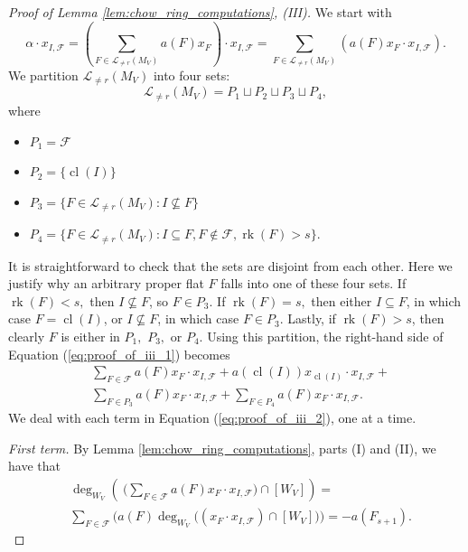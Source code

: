 \documentclass{amsart}
\theoremstyle{plain}
\theoremstyle{definition}
\newcommand{\rk}{\operatorname{rk}}
\newcommand{\cl}{\operatorname{cl}}
\begin{document}
\begin{proof}[Proof of Lemma \ref{lem:chow_ring_computations}, (III)]
We start with 
\begin{equation}
\label{eq:proof_of_iii_1}
    \alpha \cdot x_{I, \mathscr{F}} = \left( \sum_{F \in \mathcal{L}_{\neq r} (M_V)} a(F)x_F \right) \cdot x_{I, \mathscr{F}} = \sum_{F \in \mathcal{L}_{\neq r} (M_V)} \left( a(F) x_F \cdot x_{I, \mathscr{F}} \right).
\end{equation}
We partition $\mathcal{L}_{\neq r}(M_V)$ into four sets:
\[\mathcal{L}_{\neq r}(M_V) = P_1 \sqcup P_2 \sqcup P_3 \sqcup P_4,\]
where
\begin{itemize}
    \item $P_1 = \mathscr{F}$
    \item $P_2 = \{\cl(I)\}$
    \item $P_3 = \{ F\in \mathcal{L}_{\neq r}(M_V)  : I \not \subseteq F\}$
    \item $P_4 = \{F\in \mathcal{L}_{\neq r}(M_V): I \subseteq F, F\notin \mathscr{F}, \rk(F) > s\}.$
\end{itemize}
It is straightforward to check that the sets are disjoint from each other. Here we justify why an arbitrary proper flat $F$ falls into one of these four sets. If $\rk(F) < s,$ then $I \not \subseteq F$, so $F \in P_3$. If $\rk(F) = s,$ then either $I \subseteq F$, in which case $F = \cl(I)$, or $I\not \subseteq F$, in which case $F\in P_3$. Lastly, if $\rk(F) > s$, then clearly $F$ is either in $P_1,$ $P_3,$ or $P_4$.
Using this partition, the right-hand side of Equation (\ref{eq:proof_of_iii_1}) becomes
\begin{equation}
\label{eq:proof_of_iii_2}
\begin{split}
& \sum_{F \in \mathscr{F}}a(F)x_F \cdot x_{I, \mathscr{F}} + a(\cl(I))x_{\cl(I)} \cdot  x_{I,\mathscr{F}} + \\ & \sum_{F \in P_3}a(F)x_F \cdot  x_{I, \mathscr{F}} + \sum_{F \in P_4} a(F)x_F \cdot x_{I, \mathscr{F}}.
\end{split}
\end{equation}
We deal with each term in Equation (\ref{eq:proof_of_iii_2}), one at a time.

\noindent
\textit{First term.} By Lemma \ref{lem:chow_ring_computations}, parts (I) and (II), we have that
\begin{equation}
\begin{split}
& \deg_{W_V}\left(\ \Big( \sum_{F \in \mathscr{F}}a(F)x_F \cdot x_{I, \mathscr{F}} \Big) \cap [W_V] \right) = \\ & \sum_{F \in \mathscr{F}} \Big( a(F) \deg_{W_V}\big((x_F \cdot x_{I, \mathscr{F}}) \cap [W_V]\big) \Big) = -a(F_{s+1}).
\end{split}
\end{equation}


\end{proof}
\end{document}
